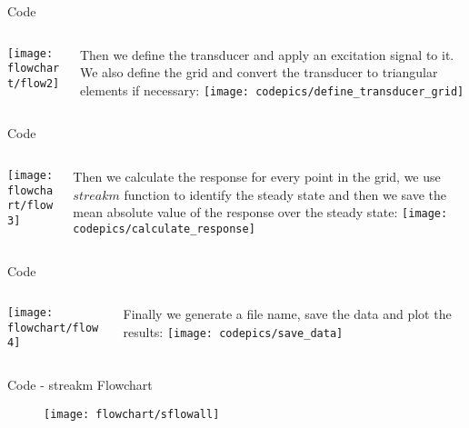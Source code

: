 \documentclass{beamer}
\begin{document}
\begin{frame}{Code}
	\begin{columns}[T] %
		\begin{column}[]{.05\textwidth}
			\texttt{[image: flowchart/flow2]}
		\end{column}%
		\hfill%
		\begin{column}{.8\textwidth}
			\small{Then we define the transducer and apply an excitation signal to it. We also define the grid and convert the transducer to triangular elements if necessary:}
			\newline
			\texttt{[image: codepics/define\_transducer\_grid]}
		\end{column}%
	\end{columns}
\end{frame}

\begin{frame}{Code}
	\begin{columns}[T] %
		\begin{column}[]{.05\textwidth}
			\texttt{[image: flowchart/flow3]}
		\end{column}%
		\hfill%
		\begin{column}{.8\textwidth}
			\small{Then we calculate the response for every point in the grid, we use $streakm$ function to identify the steady state and then we save the mean absolute value of the response over the steady state:}
			\newline
			\texttt{[image: codepics/calculate\_response]}
		\end{column}%
	\end{columns}
\end{frame}

\begin{frame}{Code}
	\begin{columns}[T] %
		\begin{column}[]{.05\textwidth}
			\texttt{[image: flowchart/flow4]}
		\end{column}%
		\hfill%
		\begin{column}{.8\textwidth}
			\small{Finally we generate a file name, save the data and plot the results:}
			\newline
			\texttt{[image: codepics/save\_data]}
		\end{column}%
	\end{columns}
\end{frame}

\begin{frame}{Code - streakm Flowchart}
	\begin{figure}[\centering]
		\texttt{[image: flowchart/sflowall]}
	\end{figure}
\end{frame}
\end{document}
